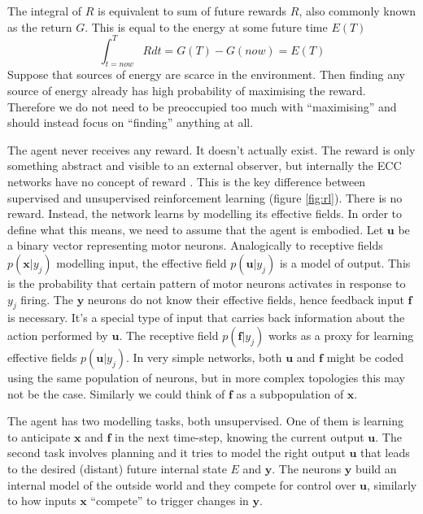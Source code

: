 \documentclass[12pt]{article}
\begin{document}
The integral of $R$ is equivalent to sum of future rewards $R$, also commonly known as the return $G$. This is equal to the energy at some future time $E(T)$
\[
\int_{t=now}^{T} R dt = G(T) - G(now) = E(T)
\]
Suppose that sources of energy are scarce in the environment. Then finding any source of energy already has high probability of maximising the reward. Therefore we do not need to be preoccupied too much with ``maximising'' and should instead focus on ``finding'' anything at all. 

The agent never receives any reward. It doesn't actually exist. The reward is only something abstract and visible to an external observer, but internally the ECC networks have no concept of reward . This is the key difference between supervised and unsupervised reinforcement learning (figure \ref{fig:rl}). There is no reward. Instead, the network learns by modelling its effective fields. In order to define what this means, we need to assume that the agent is embodied. Let $\boldsymbol{u}$ be a binary vector representing motor neurons.
Analogically to receptive fields $p(\boldsymbol{x}|y_j)$ modelling input, the effective field
$p(\boldsymbol{u}|y_j)$ is a model of output. This is the probability that certain pattern of motor neurons activates in response to $y_j$ firing. The $\boldsymbol{y}$ neurons do not know their effective fields, hence feedback input $\boldsymbol{f}$ is necessary. It's a special type of input that carries back information about the action performed by $\boldsymbol{u}$. The receptive field $p(\boldsymbol{f}|y_j)$ works as a proxy for learning effective fields $p(\boldsymbol{u}|y_j)$. In very simple networks, both $\boldsymbol{u}$ and $\boldsymbol{f}$ might be coded using the same population of neurons, but in more complex topologies this may not be the case. Similarly we could think of $\boldsymbol{f}$ as a subpopulation of $\boldsymbol{x}$. 

The agent has two modelling tasks, both unsupervised. One of them is learning to anticipate $\boldsymbol{x}$ and $\boldsymbol{f}$ in the next time-step, knowing the current output $\boldsymbol{u}$. The second task involves planning and it tries to model the right output $\boldsymbol{u}$ that leads to the desired (distant) future internal state $E$ and $\boldsymbol{y}$. The neurons $\boldsymbol{y}$ build an internal model of the outside world and they compete for control over $\boldsymbol{u}$, similarly to how inputs $\boldsymbol{x}$ ``compete'' to trigger changes in $\boldsymbol{y}$.
\end{document}
